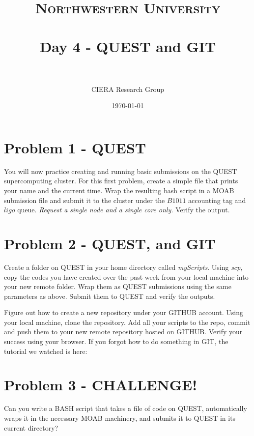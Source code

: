 \documentclass[paper=a4, fontsize=11pt]{scrartcl} %
\title{	
\normalfont \normalsize 
\textsc{Northwestern University} \\ [25pt] %
\horrule{0.5pt} \\[0.4cm] %
\huge Day 4 - QUEST and GIT \\ %
\horrule{2pt} \\[0.5cm] %
}
\author{CIERA Research Group} %
\date{\normalsize\today} %
\numberwithin{equation}{section} %
\numberwithin{figure}{section} %
\numberwithin{table}{section} %
\begin{document}
\maketitle %

\section{Problem 1 - QUEST}
You will now practice creating and running basic submissions on the QUEST supercomputing cluster. For this first problem, create a simple file that prints your name and the current time. Wrap the resulting bash script in a MOAB submission file and submit it to the cluster under the $B1011$ accounting tag and $ligo$ queue. \textit{Request a single node and a single core only.} Verify the output.

\section{Problem 2 - QUEST, and GIT}
Create a folder on QUEST in your home directory called \textit{myScripts}. Using \textit{scp}, copy the codes you have created over the past week from your local machine into your new remote folder. Wrap them as QUEST submissions using the same parameters as above. Submit them to QUEST and verify the outputs.

\vspace{2mm}

Figure out how to create a new repository under your GITHUB account. Using your local machine, clone the repository. Add all your scripts to the repo, commit and push them to your new remote repository hosted on GITHUB. Verify your success using your browser. If you forgot how to do something in GIT, the tutorial we watched is here:


\section{Problem 3 - CHALLENGE!}

Can you write a BASH script that takes a file of code on QUEST, automatically wraps it in the necessary MOAB machinery, and submits it to QUEST in its current directory? 

\end{document}
